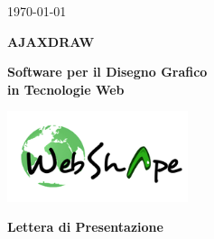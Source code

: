 \usepackage{multirow}


\renewcommand{\TITOLODOC}{Lettera di Presentazione} %

\begin{titlepage}
\begin{center}
	\begin{Large}	\today \end{Large}
\end{center}

\vspace{20pt}

\begin{center}
	\begin{Huge}
				\textbf{AJAXDRAW}
	\end{Huge}
\end{center}			

\begin{center}
	\begin{large}
				\textbf{Software per il Disegno Grafico\\ in Tecnologie Web}
	\end{large}
\end{center}			

\vspace{20pt}

\begin{center}
\includegraphics[width=150pt]{logo}
\end{center}

\vspace{160pt}
\begin{center} %
	\begin{Huge}
				\textbf{\TITOLODOC}
	\end{Huge}
			\\
\end{center}
\vspace{100pt}
\end{titlepage}

